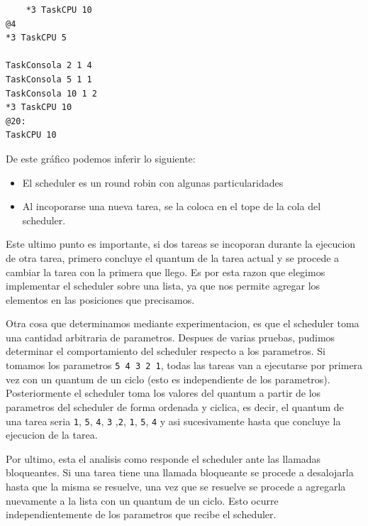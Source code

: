 \begin{lstlisting}
	*3 TaskCPU 10
@4
*3 TaskCPU 5

TaskConsola 2 1 4
TaskConsola 5 1 1
TaskConsola 10 1 2
*3 TaskCPU 10
@20:
TaskCPU 10
\end{lstlisting}

De este gráfico podemos inferir lo siguiente:

\begin{itemize}
	\item El scheduler es un round robin con algunas particularidades
	\item Al incoporarse una nueva tarea, se la coloca en el tope de la cola del scheduler.
\end{itemize}

Este ultimo punto es importante, si dos tareas se incoporan durante la ejecucion de otra tarea, primero concluye el quantum de la tarea actual y se procede a cambiar la tarea con la primera que llego. Es por esta razon que elegimos implementar el scheduler sobre una lista, ya que nos permite agregar los elementos en las posiciones que precisamos.

Otra cosa que determinamos mediante experimentacion, es que el scheduler toma una cantidad arbitraria de parametros. Despues de varias pruebas, pudimos determinar el comportamiento del scheduler respecto a los parametros. Si tomamos los parametros \texttt{5 4 3 2 1}, todas las tareas van a ejecutarse por primera vez con un quantum de un ciclo (esto es independiente de los parametros). Posteriormente el scheduler toma los valores del quantum a partir de los parametros del scheduler de forma ordenada y ciclica, es decir, el quantum de una tarea seria \texttt{1}, \texttt{5}, \texttt{4}, \texttt{3} ,\texttt{2}, \texttt{1}, \texttt{5}, \texttt{4} y asi sucesivamente hasta que concluye la ejecucion de la tarea.

Por ultimo, esta el analisis como responde el scheduler ante las llamadas bloqueantes. Si una tarea tiene una llamada bloqueante se procede a desalojarla hasta que la misma se resuelve, una vez que se resuelve se procede a agregarla nuevamente a la lista con un quantum de un ciclo. Esto ocurre independientemente de los parametros que recibe el scheduler.
